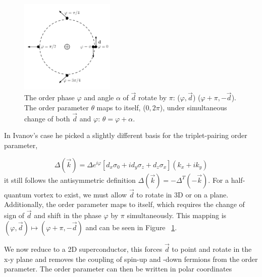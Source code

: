 \begin{figure}
  \includegraphics[width=0.4\textwidth]{./figures/half-quantum-vortex.pdf}
  \caption{The order phase $\varphi$ and angle $\alpha$ of $\vec{d}$ rotate by $\pi$: ($\varphi , \vec{d}$) \rightarrow ($\varphi+\pi, -\vec{d}$). The order parameter $\theta$ maps to itself, ($0, 2\pi$), under simultaneous change of both $\vec{d}$ and $\varphi$: $\theta = \varphi + \alpha$.}
  \label{fig:half-quantum-vortex}
\end{figure}

In Ivanov's case he picked a slightly different basis for the triplet-pairing order parameter,

\begin{equation}
  \Delta (\vec{k}) = \Delta e^{i\varphi} \left[ d_x \sigma_0 + i d_y \sigma_z + d_z \sigma_x \right] (k_x + i k_y)
\end{equation}
it still follows the antisymmetric definition
$\Delta(\vec{k}) = -\Delta^T (-\vec{k})$.
For a half-quantum vortex to exist, we must allow $\vec{d}$ to rotate in 3D or on a plane.
Additionally, the order parameter maps to itself, which requires the change of sign of $\vec{d}$ and shift in the phase $\varphi$ by $\pi$ simultaneously.
This mapping is
$(\varphi, \vec{d}) \mapsto (\varphi+\pi,-\vec{d})$
and can be seen in Figure ~\ref{fig:half-quantum-vortex}.

We now reduce to a 2D superconductor, this forces $\vec{d}$ to point and rotate in the x-y plane and removes the coupling of spin-up and -down fermions from the order parameter.
The order parameter can then be written in polar coordinates

